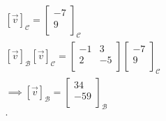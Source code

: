 \documentclass{report}
\begin{document}
{    \begin{align*}
     \left[ \vec{ v}  \right] _{ \mathcal{C}} = \begin{bmatrix}
     -7\\
     9\\
     \end{bmatrix}
     _{ \mathcal{C}}\\
     \left[ \vec{ v}  \right] _{ \mathcal{B}} \left[ \vec{ v}  \right] _{ \mathcal{C}} = \begin{bmatrix}
     -1 & 3\\
     2 & -5\\
     \end{bmatrix}  \begin{bmatrix}
     -7\\
     9\\
     \end{bmatrix}
     _ { \mathcal{C}}\\
     \implies \left[ \vec{ v}  \right] _{ \mathcal{B}} = \begin{bmatrix}
     34\\
     -59\\
     \end{bmatrix}
     _{ \mathcal{B}}\\
    .\end{align*}
  }
  
\end{document}
